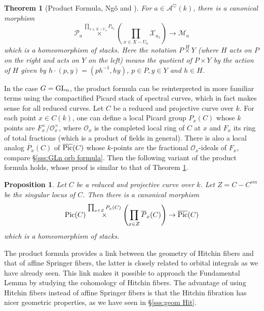 \documentclass[]{pcmi}
\theoremstyle{plain}
\newtheorem{theorem}[equation]{Theorem}
\newtheorem{prop}[equation]{Proposition}
\theoremstyle{definition}
\def\calA{\mathcal{A}}
\def\calM{\mathcal{M}}
\def\calO{\mathcal{O}}
\def\calP{\mathcal{P}}
\newcommand{\sX}{\ensuremath{\mathscr{X}}\xspace}
\newcommand{\sX}{\ensuremath{\mathcal{X}}\xspace}
\newcommand{\Pic}{\textup{Pic}}
\newcommand{\cPic}{\overline{\textup{Pic}}}
\newcommand\GL{\textup{GL}}
\newcommand{\twtimes}[1]{\stackrel{#1}{\times}}
\newcommand\ov{\overline}
\newcommand{\Ah}{\calA^{\heartsuit}}
\begin{document}
\begin{theorem}[Product Formula, Ng\^o {\cite[Th 4.6]{NgoHit} and \cite[Prop 4.15.1]{NgoFL}}]\label{th:prod} For $a\in\Ah(k)$, there is a canonical morphism
\begin{equation*}
\calP_{a}\twtimes{\prod_{x\in X-U_{a}}P_{a_{x}}}\left(\prod_{x\in X-U_{a}}\sX_{a_{x}}\right)\to \calM_{a}
\end{equation*}
which is a homeomorphism of stacks. Here the notation $P\twtimes{H}Y$ (where $H$ acts on $P$ on the right and acts on $Y$ on the left) means the quotient of $P\times Y$ by the action of $H$ given by $h\cdot (p,y)=(ph^{-1}, hy)$, $p\in P, y\in Y$ and $h\in H$.
\end{theorem}

In the case $G=\GL_{n}$, the product formula can be reinterpreted in more familiar terms using the compactified Picard stack of spectral curves, which in fact makes sense for all reduced curves. Let $C$ be a reduced and projective curve over $k$. For each point $x\in C(k)$, one can define a local Picard group $P_{x}(C)$ whose $k$ points are $F^{\times}_{x}/\calO^{\times}_{x}$, where $\calO_{x}$ is the completed local ring of $C$ at $x$ and $F_{x}$ its ring of total fractions (which is a product of fields in general). There is also a local analog $\ov{P}_{x}(C)$ of $\cPic(C)$ whose $k$-points are the fractional $\calO_{x}$-ideals of $F_{x}$, compare \S\ref{sss:GLn orb formula}. Then the following variant of the product formula holds, whose proof is similar to that of Theorem \ref{th:prod}.

\begin{prop}\label{p:Pic prod} Let $C$ be a reduced and projective curve over $k$. Let $Z=C-C^{sm}$ be the singular locus of $C$. Then there is a canonical morphism 
\begin{equation*}
\Pic(C)\twtimes{\prod_{x\in Z}P_{x}(C)}\left(\prod_{x\in Z}\ov{P}_{x}(C)\right)\to\cPic(C)
\end{equation*}
which is a homeomorphism of stacks.
\end{prop}

The product formula provides a link between the geometry of Hitchin fibers and that of affine Springer fibers, the latter is closely related to orbital integrals as we have already seen. This link makes it possible to approach the Fundamental Lemma by studying the cohomology of Hitchin fibers. The advantage of using Hitchin fibers instead of affine Springer fibers is that  the Hitchin fibration has nicer geometric properties, as we have seen in \S\ref{sss:geom Hit}.
\end{document}

